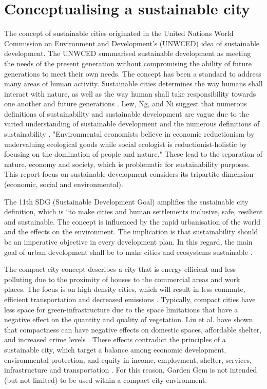 \section{Conceptualising a sustainable city}

The concept of sustainable cities originated in the United Nations World Commission on Environment and Development's (UNWCED) idea of sustainable development. The UNWCED summarised sustainable development as meeting the needs of the present generation without compromising the ability of future generations to meet their own needs. The concept has been a standard to address many areas of human activity. Sustainable cities determines the way humans shall interact with nature, as well as the way human shall take responsibility towards one another and future generations \cite{Yigitcanlar2015}. Lew, Ng, and Ni \cite{Lew2016} suggest that numerous definitions of sustainability and sustainable development are vague due to the varied understanding of sustainable development and the numerous definitions of sustainability \cite{Mebratu1998}. "Environmental economists believe in economic reductionism by undervaluing ecological goods while social ecologist is reductionist-holistic by focusing on the domination of people and nature." \cite{Mebratu1998} These lead to the separation of nature, economy and society, which is problematic for sustainability purposes. This report focus on sustainable development considers its tripartite dimension (economic, social and environmental).

The 11th SDG (Sustainable Development Goal) amplifies the sustainable city definition, which is “to make cities and human settlements inclusive, safe, resilient and sustainable. The concept is influenced by the rapid urbanisation of the world and the effects on the environment. The implication is that sustainability should be an imperative objective in every development plan. In this regard, the main goal of urban development shall be to make cities and ecosystems sustainable \cite{Hiremath2013}.

The compact city concept describes a city that is energy-efficient and less polluting due to the proximity of houses to the commercial areas and work places. The focus is on high density cities, which will result in less commute, efficient transportation and decreased emissions \cite{Abdullahi2015}. Typically, compact cities have less space for green-infrastructure due to the space limitations that have a negative effect on the quantity and quality of vegetation. Liu et al. have shown that compactness can have negative effects on domestic spaces, affordable shelter, and increased crime levels \cite{Liu2017}. These effects contradict the principles of a sustainable city, which target a balance among economic development, environmental protection, and equity in income, employment, shelter, services, infrastructure and transportation \cite{Hiremath}. For this reason, Garden Gem is not intended (but not limited) to be used within a compact city environment.

